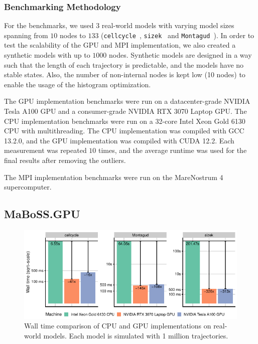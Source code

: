 \documentclass[times, twoside]{zHenriquesLab-StyleBioRxiv}
\begin{document}
\subsubsection*{Benchmarking Methodology}

For the benchmarks, we used $3$ real-world models with varying model sizes spanning from $10$ nodes to $133$ (\texttt{cellcycle}~\cite{faure2006cellcycle}, \texttt{sizek}~\cite{sizek2019boolean} and \texttt{Montagud}~\cite{montagud2022prostate}). In order to test the scalability of the GPU and MPI implementation, we also created a synthetic models with up to $1000$ nodes. Synthetic models are designed in a way such that the length of each trajectory is predictable, and the models have no stable states. Also, the number of non-internal nodes is kept low (10 nodes) to enable the usage of the histogram optimization.

The GPU implementation benchmarks were run on a datacenter-grade NVIDIA Tesla A100 GPU and a consumer-grade NVIDIA RTX 3070 Laptop GPU. The CPU implementation benchmarks were run on a 32-core Intel Xeon Gold 6130 CPU with multithreading. The CPU implementation was compiled with GCC 13.2.0, and the GPU implementation was compiled with CUDA 12.2. Each measurement was repeated $10$ times, and the average runtime was used for the final results after removing the outliers.

The MPI implementation benchmarks were run on the MareNostrum 4 supercomputer.


\subsection*{MaBoSS.GPU}

\begin{figure}
    \centering
    \includegraphics[width=\linewidth]{Figures/real.pdf}
    \caption{Wall time comparison of CPU and GPU implementations on real-world models. Each model is simulated with 1 million trajectories.}
    \label{fig:real}
\end{figure}
\end{document}
